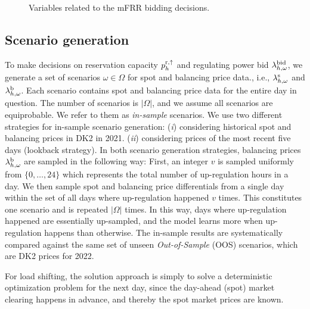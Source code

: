 \begin{figure}[b]
    \centering
    
    \caption{Variables related to the mFRR  bidding decisions.}
    \label{fig:timeline_mfrr_variables}
\end{figure}

\vspace{-1mm}
\subsection{Scenario generation}\label{sec:scenario_generation}
To make decisions on reservation capacity $p_{h}^{\rm{r},\uparrow}$ and regulating power bid $\lambda_{h,\omega}^{\rm{bid}}$, we generate a set of scenarios $\omega \in \Omega$ for spot and balancing price data., i.e., $ \lambda_{h,\omega}^{\rm{s}}$ and $ \lambda_{h,\omega}^{\rm{b}}$. Each scenario contains spot and balancing price data for the entire day in question. The number of scenarios is $|\Omega|$, and we assume all scenarios are equiprobable. We refer to them as \textit{in-sample} scenarios. We use two different strategies for in-sample scenario generation: (\textit{i}) considering historical spot and balancing prices in DK2 in 2021.
(\textit{ii}) considering prices of the most recent five days (lookback strategy). In both scenario generation strategies, balancing prices $\lambda_{h,\omega}^{\rm{b}}$ are sampled in the following way: First, an integer $v$ is sampled uniformly from $\{0, \ldots, 24\}$ which represents the total number of up-regulation hours in a day. We then sample spot and balancing price differentials from a single day within the set of all days where up-regulation happened $v$ times. This constitutes one scenario and is repeated $|\Omega|$ times. In this way, days where up-regulation happened are essentially up-sampled, and the model learns more when up-regulation happens than otherwise. The in-sample results are systematically compared against the same set of unseen \textit{Out-of-Sample} (OOS) scenarios, which are DK2 prices for 2022.

For load shifting, the solution approach is simply to solve a deterministic optimization problem for the next day, since the day-ahead (spot) market clearing happens in advance, and thereby the spot market prices are known.

\vspace{-1mm}
